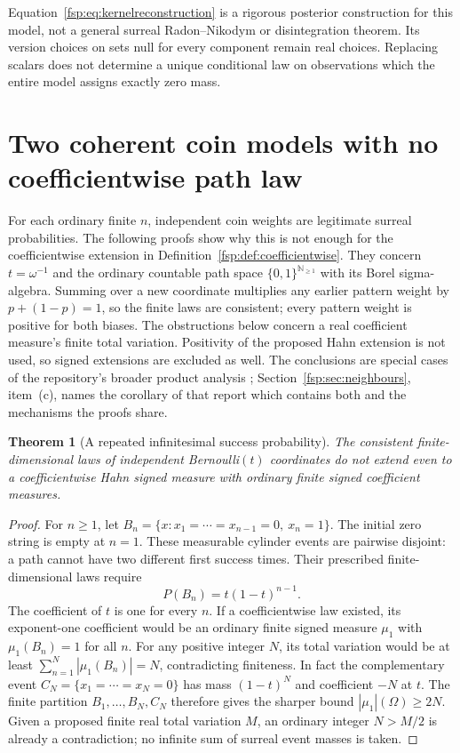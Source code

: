 \documentclass[11pt,a4paper]{article}
\numberwithin{equation}{section}
\newtheorem{theorem}{Theorem}[section]
\theoremstyle{definition}
\theoremstyle{remark}
\newcommand{\N}{\mathbb N}
\begin{document}
Equation~\eqref{fsp:eq:kernelreconstruction} is a rigorous posterior
construction for this model, not a general surreal Radon--Nikodym or
disintegration theorem. Its version choices on sets null for every
component remain real choices. Replacing scalars does not determine a
unique conditional law on observations which the entire model assigns
exactly zero mass.

\section{Two coherent coin models with no coefficientwise path law}
\label{fsp:sec:iid}

For each ordinary finite $n$, independent coin weights are legitimate
surreal probabilities. The following proofs show why this is not enough
for the coefficientwise extension in Definition~\ref{fsp:def:coefficientwise}.
They concern $t=\omega^{-1}$ and the ordinary countable path space
$\{0,1\}^{\N_{\ge1}}$ with its Borel sigma-algebra. Summing over a
new coordinate multiplies any earlier pattern weight by $p+(1-p)=1$,
so the finite laws are consistent; every pattern weight is positive for
both biases. The obstructions below concern a real coefficient measure's
finite total variation. Positivity of the proposed Hahn extension is not
used, so signed extensions are excluded as well. The conclusions are special
cases of the repository's broader product analysis \cite{repomeasures};
Section~\ref{fsp:sec:neighbours}, item~(c), names the corollary of that report
which contains both and the mechanisms the proofs share.

\begin{theorem}[A repeated infinitesimal success probability]
\label{fsp:thm:rarecoin}
The consistent finite-dimensional laws of independent Bernoulli$(t)$
coordinates do not extend even to a coefficientwise Hahn signed measure
with ordinary finite signed coefficient measures.
\end{theorem}
\begin{proof}
For $n\ge1$, let
$B_n=\{x:x_1=\cdots=x_{n-1}=0,\ x_n=1\}$.
The initial zero string is empty at $n=1$. These measurable cylinder
events are pairwise disjoint: a path cannot have two different first
success times. Their prescribed finite-dimensional laws require
\begin{equation}\label{fsp:eq:firstsuccess}
 P(B_n)=t(1-t)^{n-1}.
\end{equation}
The coefficient of $t$ is one for every $n$. If a coefficientwise law
existed, its exponent-one coefficient would be an ordinary finite
signed measure $\mu_1$ with $\mu_1(B_n)=1$ for all $n$. For any positive
integer $N$, its total variation would be at least
$\sum_{n=1}^N|\mu_1(B_n)|=N$, contradicting finiteness.
In fact the complementary event $C_N=\{x_1=\cdots=x_N=0\}$
has mass $(1-t)^N$ and coefficient $-N$ at $t$.
The finite partition $B_1,\ldots,B_N,C_N$ therefore gives the sharper
bound $|\mu_1|(\Omega)\ge2N$. Given a proposed finite real total
variation $M$, an ordinary integer $N>M/2$ is already a contradiction;
no infinite sum of surreal event masses is taken.
\end{proof}
\end{document}
